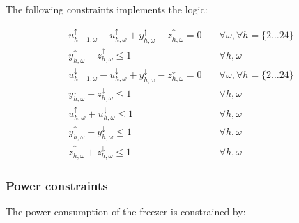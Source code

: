 \noindent The following constraints implements the logic:

\begin{subequations}\label{eq:auxillary_constraints}
    \begin{align}
        u_{h-1,\omega}^{\uparrow} - u_{h,\omega}^{\uparrow} + y_{h,\omega}^{\uparrow} - z_{h,\omega}^{\uparrow} = 0 \quad         & \forall{\omega}, \forall{h} = \{2 \ldots 24 \} \\
        y_{h,\omega}^{\uparrow} + z_{h,\omega}^{\uparrow} \leq 1 \quad                                                            & \forall{h,\omega}                              \\
        u_{h-1,\omega}^{\downarrow} - u_{h,\omega}^{\downarrow} + y_{h,\omega}^{\downarrow} - z_{h,\omega}^{\downarrow} = 0 \quad & \forall{\omega}, \forall{h} = \{2 \ldots 24 \} \\
        y_{h,\omega}^{\downarrow} + z_{h,\omega}^{\downarrow} \leq 1 \quad                                                        & \forall{h,\omega}                              \\
        u_{h,\omega}^{\uparrow} + u_{h,\omega}^{\downarrow} \leq 1 \quad                                                          & \forall{h,\omega}                              \\
        y_{h,\omega}^{\uparrow} + y_{h,\omega}^{\downarrow} \leq 1 \quad                                                          & \forall{h,\omega}                              \\
        z_{h,\omega}^{\uparrow} + z_{h,\omega}^{\downarrow} \leq 1 \quad                                                          & \forall{h,\omega}
    \end{align}
\end{subequations}

\subsubsection{Power constraints}\label{sec:power_constraints}

The power consumption of the freezer is constrained by:

